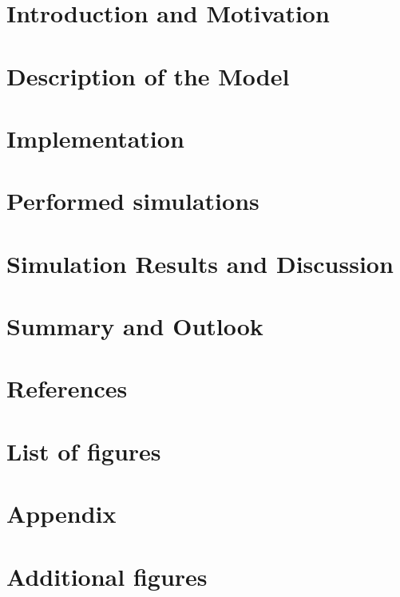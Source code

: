 \documentclass[11pt]{article}
\begin{document}
\section{Introduction and Motivation}

\newpage

\section{Description of the Model}

\newpage

\section{Implementation}

\newpage

\section{Performed simulations}

\newpage

\section{Simulation Results and Discussion}

\newpage

\section{Summary and Outlook}

\newpage

\section{References}



\newpage
\section{List of figures}
\listoffigures

\newpage
\begin{appendix}
\section*{Appendix}

\clearpage
\section{Additional figures}

\clearpage

\end{appendix}



\end{document}
